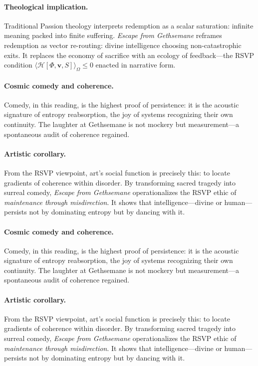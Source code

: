 \documentclass[12pt]{article}
\begin{document}
\paragraph{Theological implication.}
Traditional Passion theology interprets redemption as a scalar saturation: infinite meaning packed into finite suffering.  
\emph{Escape from Gethsemane} reframes redemption as vector re-routing: divine intelligence choosing non-catastrophic exits.  
It replaces the economy of sacrifice with an ecology of feedback---the RSVP condition \(\langle \mathcal H[\Phi,\mathbf v,S]\rangle_\Omega \le 0\) enacted in narrative form.

\paragraph{Cosmic comedy and coherence.}
Comedy, in this reading, is the highest proof of persistence:  
it is the acoustic signature of entropy reabsorption, the joy of systems recognizing their own continuity.  
The laughter at Gethsemane is not mockery but measurement—a spontaneous audit of coherence regained.

\paragraph{Artistic corollary.}
From the RSVP viewpoint, art’s social function is precisely this: to locate gradients of coherence within disorder.  
By transforming sacred tragedy into surreal comedy, \emph{Escape from Gethsemane} operationalizes the RSVP ethic of \emph{maintenance through misdirection}.  
It shows that intelligence---divine or human---persists not by dominating entropy but by dancing with it.

\paragraph{Cosmic comedy and coherence.}
Comedy, in this reading, is the highest proof of persistence:  
it is the acoustic signature of entropy reabsorption, the joy of systems recognizing their own continuity.  
The laughter at Gethsemane is not mockery but measurement—a spontaneous audit of coherence regained.

\paragraph{Artistic corollary.}
From the RSVP viewpoint, art’s social function is precisely this: to locate gradients of coherence within disorder.  
By transforming sacred tragedy into surreal comedy, \emph{Escape from Gethsemane} operationalizes the RSVP ethic of \emph{maintenance through misdirection}.  
It shows that intelligence---divine or human---persists not by dominating entropy but by dancing with it.
\end{document}
